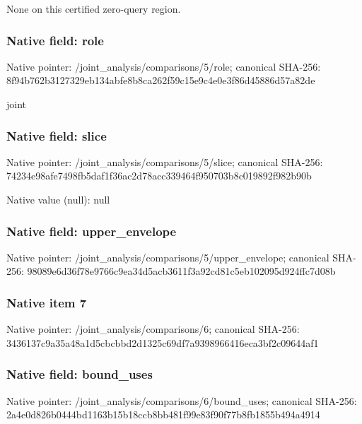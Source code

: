 \documentclass[10pt,a4paper]{article}
\begin{document}
\begingroup\raggedright\sloppy None on this certified zero-query region.\par\endgroup

\subsubsection{Native field: role}
Native pointer: /joint\_\allowbreak{}analysis/comparisons/5/role; canonical SHA-256: 8f94b762b3127329eb134abfe8b8ca262f59c15e9c4e0e3f86d45886d57a82de

\begingroup\raggedright\sloppy joint\par\endgroup

\subsubsection{Native field: slice}
Native pointer: /joint\_\allowbreak{}analysis/comparisons/5/slice; canonical SHA-256: 74234e98afe7498fb5daf1f36ac2d78acc339464f950703b8c019892f982b90b

Native value (null): null

\subsubsection{Native field: upper\_\allowbreak{}envelope}
Native pointer: /joint\_\allowbreak{}analysis/comparisons/5/upper\_\allowbreak{}envelope; canonical SHA-256: 98089e6d36f78e9766c9ea34d5acb3611f3a92cd81c5eb102095d924ffc7d08b

\begingroup\raggedright{}\par\endgroup

\subsubsection{Native item 7}
Native pointer: /joint\_\allowbreak{}analysis/comparisons/6; canonical SHA-256: 3436137c9a35a48a1d5cbcbbd2d1325c69df7a9398966416eca3bf2c09644af1

\subsubsection{Native field: bound\_\allowbreak{}uses}
Native pointer: /joint\_\allowbreak{}analysis/comparisons/6/bound\_\allowbreak{}uses; canonical SHA-256: 2a4e0d826b0444bd1163b15b18ccb8bb481f99e83f90f77b8fb1855b494a4914
\end{document}
